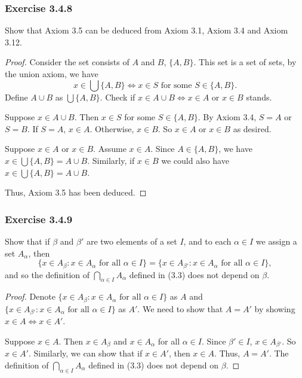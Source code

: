 \documentclass[12pt, letter]{article}
\begin{document}
\subsubsection*{Exercise 3.4.8}
Show that Axiom 3.5 can be deduced from Axiom 3.1, Axiom 3.4 and Axiom 3.12.
\begin{proof}
    Consider the set consists of $A$ and $B$, $\{A, B\}$. This set is a set of sets, by the union axiom, we have 
    \begin{equation*}
        x\in \bigcup\{A,B\}\iff x\in S\text{ for some }S\in\{A,B\}.
    \end{equation*}
    Define $A\cup B$ as $\bigcup\{A,B\}$. Check if $x\in A\cup B\iff x\in A\text{ or }x\in B$ stands.

    Suppose $x\in A\cup B$. Then $x\in S$ for some $S\in \{A,B\}$. By Axiom 3.4, $S=A$ or $S=B$. If $S=A$, $x\in A$. Otherwise, $x\in B$.
    So $x\in A$ or $x\in B$ as desired.

    Suppose $x\in A$ or $x\in B$. Assume $x\in A$. Since $A\in\{A,B\}$, we have $x\in \bigcup\{A,B\}=A\cup B$. Similarly, if $x\in B$ we could also have $x\in \bigcup\{A,B\}=A\cup B$.

    Thus, Axiom 3.5 has been deduced.
\end{proof}
\subsubsection*{Exercise 3.4.9}
Show that if $\beta$ and $\beta'$ are two elements of a set $I$, and to each $\alpha\in I$ we assign a set $A_{\alpha}$, then 
\begin{equation*}
    \{x\in A_{\beta}:x\in A_{\alpha}\text{ for all }\alpha\in I\}=\{x\in A_{\beta'}: x\in A_{\alpha} \text{ for all }\alpha\in I\},
\end{equation*}
and so the definition of $\bigcap_{\alpha\in I}A_{\alpha}$ defined in (3.3) does not depend on $\beta$.
\begin{proof}
    Denote $\{x\in A_{\beta}:x\in A_{\alpha}\text{ for all }\alpha\in I\}$ as $A$ and $\{x\in A_{\beta'}: x\in A_{\alpha} \text{ for all }\alpha\in I\}$ as $A'$. 
    We need to show that $A=A'$ by showing $x\in A\iff x\in A'$. 

    Suppose $x\in A$. Then $x\in A_{\beta}$ and $x\in A_{\alpha}$ for all $\alpha\in I$. Since $\beta'\in I$, $x\in A_{\beta'}$. So $x\in A'$.
    Similarly, we can show that if $x\in A'$, then $x\in A$. Thus, $A=A'$. The definition of $\bigcap_{\alpha\in I}A_{\alpha}$ defined in (3.3) does not depend on $\beta$.
\end{proof} 
\end{document}
